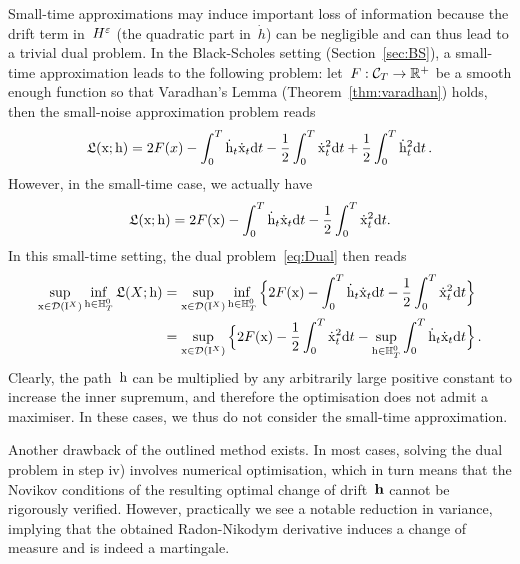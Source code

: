 \begin{remark}
Small-time approximations may induce important loss of information
because the drift term in~$H^\varepsilon$ (the quadratic part in~$\dot{h}$) can be negligible and can thus lead to a trivial dual problem. 
In the Black-Scholes setting (Section~\ref{sec:BS}),
a small-time approximation leads to the following problem: 
let~$F:\mathcal{C}_T\rightarrow\mathbb{R}^+$ be a smooth enough function so that Varadhan's Lemma (Theorem~\ref{thm:varadhan}) holds, then the small-noise approximation problem reads
$$
\mathfrak{L}(\mathrm{x};\mathrm{h}) = 2 F(x)  - \int_0^T\dot{\mathrm{h}}_t \dot{\mathrm{x}}_t\mathrm{d} t
- \frac{1}{2}\int_0^T\dot{\mathrm{x}}_t^2\mathrm{d} t
+ \frac{1}{2}\int_0^T\dot{\mathrm{h}}_t^2\mathrm{d} t\,.
$$
However, in the small-time case, we actually have
$$
\mathfrak{L}(\mathrm{x};\mathrm{h}) = 
2F(\mathrm{x}) - \int_0^T\dot{\mathrm{h}}_t \dot{\mathrm{x}}_t\mathrm{d} t
- \frac{1}{2}\int_0^T\dot{\mathrm{x}}_t^2\mathrm{d} t.
$$
In this small-time setting, the dual problem~\eqref{eq:Dual} then reads
\begin{align*}
\sup_{\mathrm{x}\in\mathcal{D}(\mathrm{I}^{X})}\inf_{\mathrm{h}\in\mathbb{H}^0_T} \mathfrak{L}(X;\mathrm{h})
 & = \sup_{\mathrm{x}\in \mathcal{D}(\mathrm{I}^{X})} \inf_{\mathrm{h}\in\mathbb{H}^0_T} \Big\{2F(\mathrm{x}) - \int_0^T\dot{\mathrm{h}}_t \dot{\mathrm{x}}_t\mathrm{d} t - \frac{1}{2}\int_0^T\dot{\mathrm{x}}_t^2\mathrm{d} t\Big\}\\
 & = \sup_{\mathrm{x}\in \mathcal{D}(\mathrm{I}^{X})} \Big\{2F(\mathrm{x})
 - \frac{1}{2}\int_0^T\dot{\mathrm{x}}_t^2\mathrm{d} t
 - \sup_{\mathrm{h}\in\mathbb{H}^0_T}\int_0^T\dot{\mathrm{h}}_t \dot{\mathrm{x}}_t\mathrm{d} t\Big\}\,.
\end{align*}
Clearly, the path~$\mathrm{h}$ can be multiplied by any arbitrarily large positive constant to increase the inner supremum, 
and therefore the optimisation does not admit a maximiser.
In these cases, we thus do not consider the small-time approximation.
\end{remark}
\begin{remark}
Another drawback of the outlined method exists. In most cases, solving the dual problem in step iv) involves numerical optimisation, which in turn means that the Novikov conditions of the resulting optimal change of drift~$\boldsymbol{\mathrm{h}}$ cannot be rigorously verified. However, practically we see a notable reduction in variance, implying that the obtained Radon-Nikodym derivative induces a change of measure and is indeed a martingale.
\end{remark}

